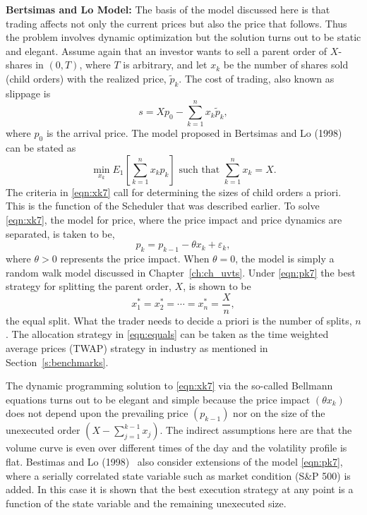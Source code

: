 \noindent\textbf{Bertsimas and Lo Model:} The basis of the model discussed here is that trading affects not only the current prices but also the price that follows. Thus the problem involves dynamic optimization but the solution turns out to be static and elegant. Assume again that an investor wants to sell a parent order of $X$-shares in $(0,T)$, where $T$ is arbitrary, and let $x_k$ be the number of shares sold (child orders) with the realized price, $\widetilde{p}_k$. The cost of trading, also known as slippage is
	\begin{equation} \label{eqn:x7}
	s= Xp_0 - \sum_{k=1}^n x_k\widetilde{p}_k,
	\end{equation}
where $p_0$ is the arrival price. The model proposed in Bertsimas and Lo (1998)~\cite{berlo} can be stated as
	\begin{equation} \label{eqn:xk7}
	\min_{x_k} E_1 \left[\sum_{k=1}^n x_kp_k\right] \text{ such that }\sum_{k=1}^n x_k=X.
	\end{equation}
The criteria in \eqref{eqn:xk7} call for determining the sizes of child orders a priori. This is the function of the Scheduler that was described earlier. To solve \eqref{eqn:xk7}, the model for price, where the price impact and price dynamics are separated, is taken to be,
	\begin{equation} \label{eqn:pk7}
	p_k = p_{k-1} - \theta x_k + \varepsilon_k,
	\end{equation}
where $\theta > 0$ represents the price impact. When $\theta = 0$, the model is simply a random walk model discussed in Chapter~\ref{ch:ch_uvts}. Under \eqref{eqn:pk7} the best strategy for splitting the parent order, $X$, is shown to be
	\begin{equation} \label{eqn:equals}
	x_1^* = x_2^* = \cdots = x_n^* = \frac{X}{n},
	\end{equation}
the equal split. What the trader needs to decide a priori is the number of splits, $n$. The allocation strategy in \eqref{eqn:equals} can be taken as the time weighted average prices (TWAP) strategy in industry as mentioned in Section~\ref{s:benchmarks}.


The dynamic programming solution to \eqref{eqn:xk7} via the so-called Bellmann equations turns out to be elegant and simple because the price impact $(\theta x_k)$ does not depend upon the prevailing price $(p_{k-1})$ nor on the size of the unexecuted order $(X - \sum_{j=1}^{k-1} x_j)$. The indirect assumptions here are that the volume curve is even over different times of the day and the volatility profile is flat. Bestimas and Lo (1998)~\cite{berlo} also consider extensions of the model \eqref{eqn:pk7}, where a serially correlated state variable such as market condition (S\&P 500) is added. In this case it is shown that the best execution strategy at any point is a function of the state variable and the remaining unexecuted size. 


